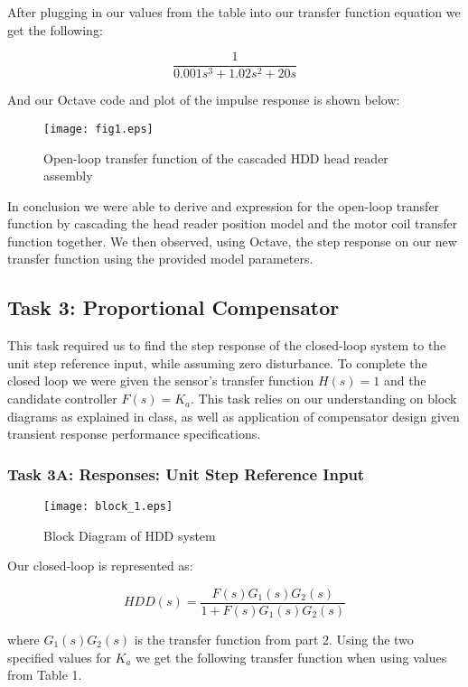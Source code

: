 \documentclass{article}
\newcommand{\matlab}[1]{%
%
}
\begin{document}
After plugging in our values from the table into our transfer function
equation we get the following:

$$\frac{1}{0.001s^3 + 1.02 s^2 + 20s}$$

And our Octave code and plot of the impulse response is shown below:

\matlab{fig1.m}

\begin{figure}[H]
  \caption{Open-loop transfer function of the cascaded HDD head reader
    assembly}
  \centering
  \texttt{[image: fig1.eps]}
\end{figure}

In conclusion we were able to derive and expression for the open-loop
transfer function by cascading the head reader position model and the
motor coil transfer function together. We then observed, using Octave,
the step response on our new transfer function using the provided
model parameters.

\subsection*{Task 3: Proportional Compensator}

This task required us to find the step response of the closed-loop system to
the unit step reference input, while assuming zero disturbance. To complete the
closed loop we were given the sensor's transfer function $H(s) = 1$ and the
candidate controller $F(s) = K_a$. This task relies on our understanding on
block diagrams as explained in class, as well as application of compensator
design given transient response performance specifications.

\subsubsection*{Task 3A: Responses: Unit Step Reference Input}

\begin{figure}[H]
  \centering
  \caption{Block Diagram of HDD system}
  \texttt{[image: block\_1.eps]}
\end{figure}


Our closed-loop is represented as: 

$$HDD(s) = \frac{F(s)G_1(s)G_2(s)}{1 + F(s)G_1(s)G_2(s)}$$

\noindent
where $G_1(s)G_2(s)$ is the transfer function from part 2. Using the two
specified values for $K_a$ we get the following transfer function when using
values from Table 1.
\end{document}
